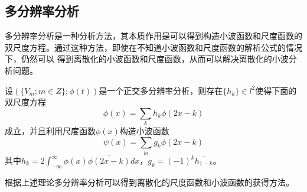 \subsection{多分辨率分析}
多分辨率分析是一种分析方法，其本质作用是可以得到构造小波函数和尺度函数的双尺度方程。通过这种方法，即使在不知道小波函数和尺度函数的解析公式的情况下，仍然可以
得到离散化的小波函数和尺度函数，从而可以解决离散化的小波分析问题。
\par 设$(\{ V_{m};m\in Z\} ;\phi(t))$是一个正交多分辨率分析，则存在$\{ h_{k} \}\in l^{2}$使得下面的双尺度方程
\begin{equation}
	\phi(x) = \sum_{k}h_{k}\phi(2x-k)
\end{equation}
成立，并且利用尺度函数$\phi(x)$构造小波函数
\begin{equation}
	\psi(x)=\sum_{ki}g_{k}\phi(2x-k)
\end{equation}
其中$h_{k}=2\int_{-\infty}^{\infty}\phi(x)\overline{\phi(2x-k)}dx$，$g_{k}=(-1)^{k}\overline{h_{1-k}}$。
\par 根据上述理论多分辨率分析可以得到离散化的尺度函数和小波函数的获得方法。
